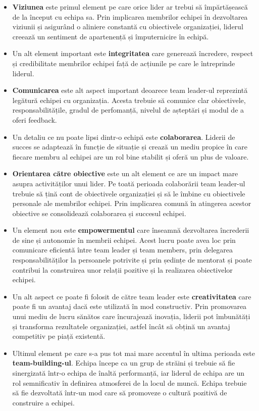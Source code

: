 \documentclass[a4paper, 12pt]{article}
\begin{document}
	\begin{itemize}
	\item\textbf{Viziunea} este primul element pe care orice lider ar trebui să împărtășească de la început cu echipa sa. Prin implicarea membrilor echipei în dezvoltarea viziunii și asigurând o aliniere constantă cu obiectivele organizației, liderul creează un sentiment de apartenență și împuternicire în echipă.

	\item Un alt element important este \textbf{integritatea} care generează încredere, respect și credibilitate membrilor echipei față de acțiunile pe care le întreprinde liderul.

	\item \textbf{Comunicarea} este alt aspect important deoarece team leader-ul reprezintă legătură echipei cu organizația. Acesta trebuie să comunice clar obiectivele, responsabilitățile, gradul de perfomanță, nivelul de așteptări și modul de a oferi feedback.

	\item Un detaliu ce nu poate lipsi dintr-o echipă este \textbf{colaborarea}. Liderii de succes se adaptează în funcție de situație și crează un mediu propice în care fiecare membru al echipei are un rol bine stabilit și oferă un plus de valoare.

	\item \textbf{Orientarea către obiective} este un alt element ce are un impact mare asupra activităților unui lider. Pe toată perioada colaborării team leader-ul trebuie să țină cont de obiectivele organizației și să le îmbine cu obiectivele personale ale membrilor echipei. Prin implicarea comună în atingerea acestor obiective se consolidează colaborarea și succesul echipei.

	\item Un element nou este \textbf{empowermentul} care înseamnă dezvoltarea încrederii de sine și autonomie în membrii echipei. Acest lucru poate avea loc prin comunicare eficientă între team leader și team members, prin delegarea responsabilităților la persoanele potrivite și prin ședințe de mentorat și poate contribui la construirea unor relații pozitive și la realizarea obiectivelor echipei. 

	\item Un alt aspect ce poate fi folosit de către team leader este \textbf{creativitatea} care poate fi un avantaj dacă este utilizată în mod constructiv. Prin promovarea unui mediu de lucru sănătos care încurajează inovația, liderii pot îmbunătăți și transforma rezultatele organizației, astfel încât să obțină un avantaj competitiv pe piață existentă. 

	\item Ultimul element pe care s-a pus tot mai mare accentul în ultima perioada este\textbf{ team-building-ul}. Echipa începe ca un grup de străini și trebuie să fie sinergizată într-o echipa de înaltă performanță, iar liderul de echipa are un rol semnificativ în definirea atmosferei de la locul de muncă. Echipa trebuie să fie dezvoltată într-un mod care să promoveze o cultură pozitivă de construire a echipei. 

	\end{itemize}
\end{document}

